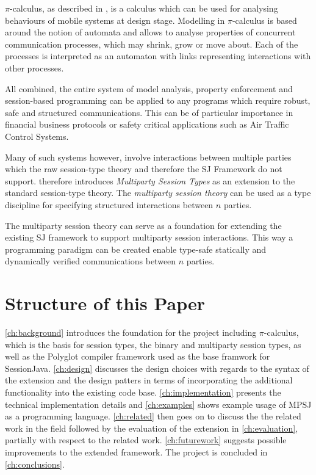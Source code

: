 $\pi$-calculus, as described in \cite{pi-calculus}, is a calculus which can be used for analysing behaviours of mobile systems at design stage. Modelling in $\pi$-calculus is based around the notion of automata and allows to analyse properties of concurrent communication processes, which may shrink, grow or move about. Each of the processes is interpreted as an automaton with links representing interactions with other processes.

All combined, the entire system of model analysis, property enforcement and session-based programming can be applied to any programs which require robust, safe and structured communications. This can be of particular importance in financial business protocols or safety critical applications such as Air Traffic Control Systems.

Many of such systems however, involve interactions between multiple parties which the raw session-type theory and therefore the SJ Framework do not support. \cite{multiparty_sess_types} therefore introduces \textit{Multiparty Session Types} as an extension to the standard session-type theory. The \textit{multiparty session theory} can be used as a type discipline for specifying structured interactions between $n$ parties.

The multiparty session theory can serve as a foundation for extending the existing SJ framework to support multiparty session interactions. This way a programming paradigm can be created enable type-safe statically and dynamically verified communications between $n$ parties. 

\section{Structure of this Paper}

\autoref{ch:background} introduces the foundation for the project including $\pi$-calculus, which is the basis for session types, the binary and multiparty session types, as well as the Polyglot compiler framework used as the base framwork for SessionJava. \autoref{ch:design} discusses the design choices with regards to the syntax of the extension and the design patters in terms of incorporating the additional functionality into the existing code base. \autoref{ch:implementation} presents the technical implementation details and \autoref{ch:examples} shows example usage of MPSJ as a programming language. \autoref{ch:related} then goes on to discuss the the related work in the field followed by the evaluation of the extension in \autoref{ch:evaluation}, partially with respect to the related work. \autoref{ch:futurework} suggests possible improvements to the extended framework. The project is concluded in \autoref{ch:conclusions}.


